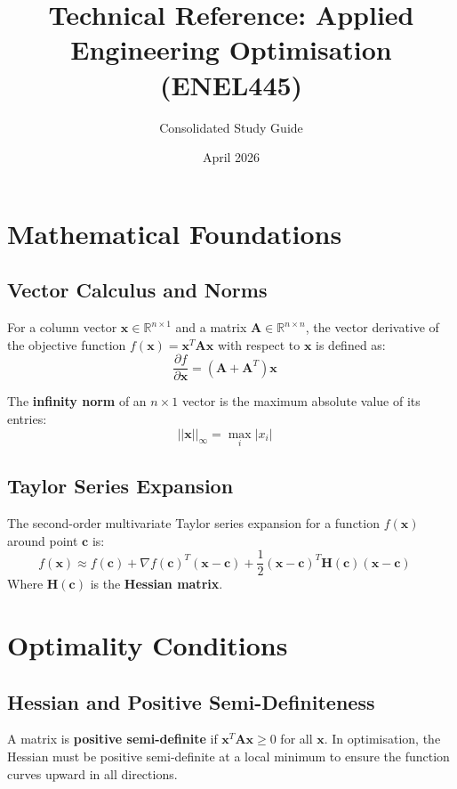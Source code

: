 \documentclass[11pt]{article}
\title{Technical Reference: Applied Engineering Optimisation (ENEL445)}
\author{Consolidated Study Guide}
\date{April 2026}
\begin{document}
\maketitle

\section{Mathematical Foundations}

\subsection{Vector Calculus and Norms}
For a column vector $\mathbf{x} \in \mathbb{R}^{n \times 1}$ and a matrix $\mathbf{A} \in \mathbb{R}^{n \times n}$, the vector derivative of the objective function $f(\mathbf{x}) = \mathbf{x}^T \mathbf{A} \mathbf{x}$ with respect to $\mathbf{x}$ is defined as:
\begin{equation}
\frac{\partial f}{\partial \mathbf{x}} = (\mathbf{A} + \mathbf{A}^T)\mathbf{x} \quad
\end{equation}

The \textbf{infinity norm} of an $n \times 1$ vector is the maximum absolute value of its entries:
\begin{equation}
||\mathbf{x}||_\infty = \max_{i} |x_i| \quad
\end{equation}

\subsection{Taylor Series Expansion}
The second-order multivariate Taylor series expansion for a function $f(\mathbf{x})$ around point $\mathbf{c}$ is:
\begin{equation}
f(\mathbf{x}) \approx f(\mathbf{c}) + \nabla f(\mathbf{c})^T (\mathbf{x} - \mathbf{c}) + \frac{1}{2}(\mathbf{x} - \mathbf{c})^T \mathbf{H}(\mathbf{c}) (\mathbf{x} - \mathbf{c}) \quad
\end{equation}
Where $\mathbf{H}(\mathbf{c})$ is the \textbf{Hessian matrix}.

\section{Optimality Conditions}

\subsection{Hessian and Positive Semi-Definiteness}
A matrix is \textbf{positive semi-definite} if $\mathbf{x}^T \mathbf{A} \mathbf{x} \geq 0$ for all $\mathbf{x}$. In optimisation, the Hessian must be positive semi-definite at a local minimum to ensure the function curves upward in all directions.
\end{document}
